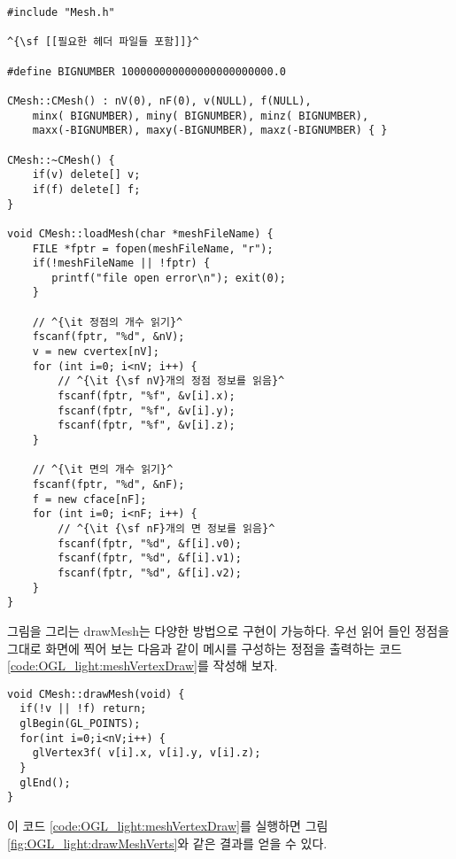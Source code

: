 \begin{algorithmbis}[메시 클래스 구현]\label{code:OGL_light:meshImplementation}
\lstset{language=C++,escapechar=^} 
\begin{lstlisting}
#include "Mesh.h" 

^{\sf [[필요한 헤더 파일들 포함]]}^

#define BIGNUMBER 100000000000000000000000.0

CMesh::CMesh() : nV(0), nF(0), v(NULL), f(NULL),
    minx( BIGNUMBER), miny( BIGNUMBER), minz( BIGNUMBER),
    maxx(-BIGNUMBER), maxy(-BIGNUMBER), maxz(-BIGNUMBER) { }

CMesh::~CMesh() {
    if(v) delete[] v;
    if(f) delete[] f;    
}

void CMesh::loadMesh(char *meshFileName) {
    FILE *fptr = fopen(meshFileName, "r");
    if(!meshFileName || !fptr) {     
       printf("file open error\n"); exit(0);    
    }

    // ^{\it 정점의 개수 읽기}^
    fscanf(fptr, "%d", &nV);
    v = new cvertex[nV];
    for (int i=0; i<nV; i++) {
        // ^{\it {\sf nV}개의 정점 정보를 읽음}^
        fscanf(fptr, "%f", &v[i].x); 
        fscanf(fptr, "%f", &v[i].y); 
        fscanf(fptr, "%f", &v[i].z);
    }

    // ^{\it 면의 개수 읽기}^
    fscanf(fptr, "%d", &nF);
    f = new cface[nF];
    for (int i=0; i<nF; i++) {
        // ^{\it {\sf nF}개의 면 정보를 읽음}^
        fscanf(fptr, "%d", &f[i].v0);   
        fscanf(fptr, "%d", &f[i].v1);    
        fscanf(fptr, "%d", &f[i].v2);
    }
}
\end{lstlisting}
\end{algorithmbis}

그림을 그리는 {\sf drawMesh}는 다양한 방법으로 구현이 가능하다. 우선 읽어 들인 정점을 그대로 화면에 찍어 보는 다음과 같이
메시를 구성하는 정점을 출력하는 코드 \ref{code:OGL_light:meshVertexDraw}를 작성해 보자.


\begin{algorithmbis}[정점 화면 출력]\label{code:OGL_light:meshVertexDraw}
\lstset{language=C++} 
\begin{lstlisting}
void CMesh::drawMesh(void) {
  if(!v || !f) return;
  glBegin(GL_POINTS);
  for(int i=0;i<nV;i++) {
    glVertex3f( v[i].x, v[i].y, v[i].z);
  }
  glEnd();
}
\end{lstlisting}
\end{algorithmbis}

이 코드 \ref{code:OGL_light:meshVertexDraw}를 실행하면 
그림 \ref{fig:OGL_light:drawMeshVerts}와 같은 결과를 얻을 수 있다.

